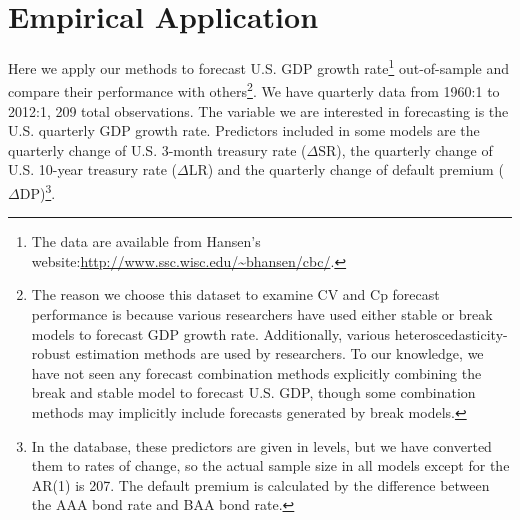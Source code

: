 \section{Empirical Application}
Here we apply our methods to forecast U.S. GDP growth rate\footnote{The data are available from Hansen's website:\url{http://www.ssc.wisc.edu/~bhansen/cbc/}.} out-of-sample and compare their performance with others\footnote{The reason we choose this dataset to examine CV and Cp forecast performance is because various researchers have used either stable or break models to forecast GDP growth rate. Additionally, various heteroscedasticity-robust estimation methods are used by researchers. To our knowledge, we have not seen any forecast combination methods explicitly combining the break and stable model to forecast U.S. GDP, though some combination methods may implicitly include forecasts generated by break models.}. We have quarterly data from 1960:1 to 2012:1, 209 total observations. The variable we are interested in forecasting is the U.S. quarterly GDP growth rate. Predictors included in some models are the quarterly change of U.S. 3-month treasury rate ($\Delta\mathrm{SR}$), the quarterly change of U.S. 10-year treasury rate ($\Delta\mathrm{LR}$) and the quarterly change of default premium ($\Delta\mathrm{DP}$)\footnote{In the database, these predictors are given in levels, but we have converted them to rates of change, so the actual sample size in all models except for the AR(1) is 207. The default premium is calculated by the difference between the AAA bond rate and BAA bond rate.}.

